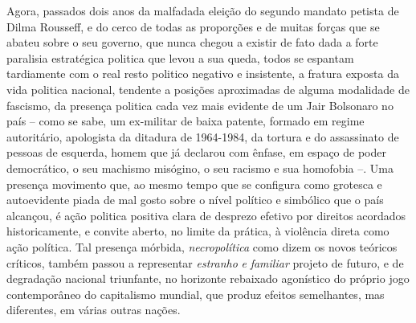 Agora, passados dois anos da malfadada eleição do segundo mandato
petista de Dilma Rousseff, e do cerco de todas as proporções e de muitas
forças que se abateu sobre o seu governo, que nunca chegou a existir de
fato dada a forte paralisia estratégica politica que levou a sua queda,
todos se espantam tardiamente com o real resto politico negativo e
insistente, a fratura exposta da vida politica nacional, tendente a
posições aproximadas de alguma modalidade de fascismo, da presença
politica cada vez mais evidente de um Jair Bolsonaro no país -- como se
sabe, um ex-militar de baixa patente, formado em regime autoritário,
apologista da ditadura de 1964-1984, da tortura e do assassinato de
pessoas de esquerda, homem que já declarou com ênfase, em espaço de
poder democrático, o seu machismo misógino, o seu racismo e sua
homofobia --. Uma presença movimento que, ao mesmo tempo que se
configura como grotesca e autoevidente piada de mal gosto sobre o nível
político e simbólico que o país alcançou, é ação politica positiva clara
de desprezo efetivo por direitos acordados historicamente, e convite
aberto, no limite da prática, à violência direta como ação política. Tal
presença mórbida, \emph{necropolítica} como dizem os novos teóricos
críticos, também passou a representar \emph{estranho} \emph{e}
\emph{familiar} projeto de futuro, e de degradação nacional triunfante,
no horizonte rebaixado agonístico do próprio jogo contemporâneo do
capitalismo mundial, que produz efeitos semelhantes, mas diferentes, em
várias outras nações.

